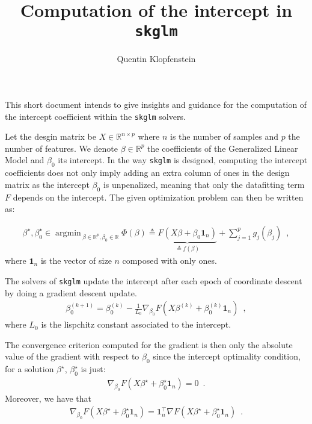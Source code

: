 \documentclass{article}
\newcommand{\bbR}{\mathbb{R}}
\newcommand{\eqdef}{\triangleq}
\newcommand{\ones}[1]{\boldsymbol{1}_#1}
\DeclareMathOperator*{\argmin}{argmin\,}
\begin{document}
\title{Computation of the intercept in \texttt{skglm}}
\author{Quentin Klopfenstein}
%
\maketitle

This short document intends to give insights and guidance for the computation of the intercept coefficient within the \texttt{skglm} solvers.

Let the desgin matrix be $X\in \mathbb{R}^{n\times p}$ where $n$ is the number of samples and $p$ the number of features. 
We denote $\beta\in\bbR^p$ the coefficients of the Generalized Linear Model and $\beta_0$ its intercept. 
In the way \texttt{skglm} is designed, computing the intercept coefficients does not only imply adding an extra column of ones in the design matrix as the intercept $\beta_0$ is unpenalized, meaning that only the datafitting term $F$ depends on the intercept. The given optimization problem can then be written as:

\begin{align}
    \beta^\star, \beta_0^\star
    \in
    \argmin_{\beta \in \bbR^p, \beta_0 \in \bbR}
    \Phi(\beta)
    \eqdef
    \underbrace{F(X\beta + \beta_0\ones{n})}_{\eqdef f(\beta)}
    + \sum_{j=1}^p g_j(\beta_j)
    \enspace ,
\end{align}
where $\ones{n}$ is the vector of size $n$ composed with only ones.

The solvers of \texttt{skglm} update the intercept after each epoch of coordinate descent by doing a gradient descent update.
\begin{align}\label{eq:cd_update_intercept}
    \beta^{(k+1)}_0 = \beta^{(k)}_0 - \frac{1}{L_0}\nabla_{\beta_0}F(X\beta^{(k)} + \beta_0^{(k)}\ones{n}) 
    \enspace ,
\end{align}
where $L_0$ is the lispchitz constant associated to the intercept.

The convergence criterion computed for the gradient is then only the absolute value of the gradient with respect to $\beta_0$ since the intercept optimality condition, for a solution $\beta^\star$, $\beta_0^\star$ is just:
\begin{align}
    \nabla_{\beta_0}F(X\beta^\star + \beta_0^\star\ones{n}) = 0
    \enspace .
\end{align}
Moreover, we have that 
\begin{align}\label{eq:grad_intercept}
    \nabla_{\beta_0}F(X\beta^\star + \beta_0^\star\ones{n}) = \ones{n}^\top \nabla F(X\beta^\star + \beta_0^\star\ones{n})
    \enspace .
\end{align}
\end{document}
